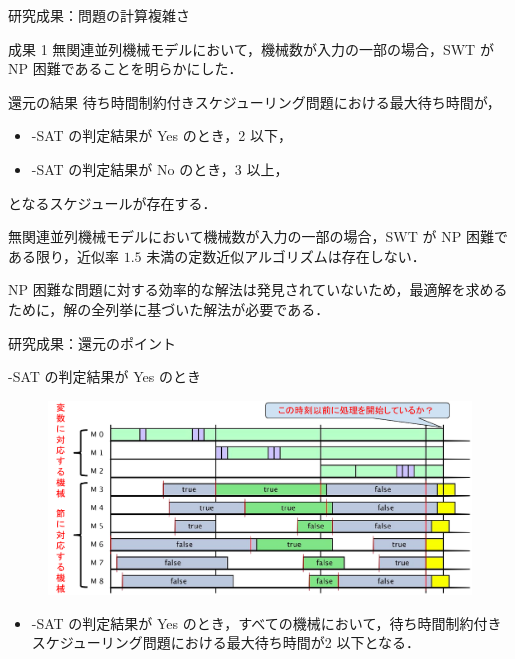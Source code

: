 \documentclass[dvipdfmx]{beamer}
\begin{document}
    \begin{frame}{研究成果：問題の計算複雑さ}
      \begin{alertblock}{成果 1}
        無関連並列機械モデルにおいて，機械数が入力の一部の場合，SWT が NP 困難であることを明らかにした．
      \end{alertblock}
      \begin{block}{還元の結果}
        待ち時間制約付きスケジューリング問題における最大待ち時間が，
        \begin{itemize}
          \item {-SAT} の判定結果が \alert{Yes} のとき，\alert{2 以下}，
          \item {-SAT} の判定結果が \alert{No} のとき，\alert{3 以上}，
        \end{itemize}
        となるスケジュールが存在する．
      \end{block}
      無関連並列機械モデルにおいて機械数が入力の一部の場合，SWT が NP 困難である限り，近似率 $1.5$ 未満の定数近似アルゴリズムは存在しない．
      \begin{alertblock}{}
        NP 困難な問題に対する効率的な解法は発見されていないため，最適解を求めるために，解の全列挙に基づいた解法が必要である．
      \end{alertblock}
    \end{frame}

    \begin{frame}{研究成果：還元のポイント}
      \begin{block}{{-SAT} の判定結果が Yes のとき}
        \begin{figure}[h]
          \centering
          \includegraphics[width=12cm]{figure/reduction1.pdf}
        \end{figure}
      \end{block}
      \begin{itemize}
        \setlength{\leftskip}{-3mm}
        \item {-SAT} の判定結果が \alert{Yes} のとき，すべての機械において，待ち時間制約付きスケジューリング問題における最大待ち時間が\alert{2 以下}となる．
      \end{itemize}
    \end{frame}
\end{document}
